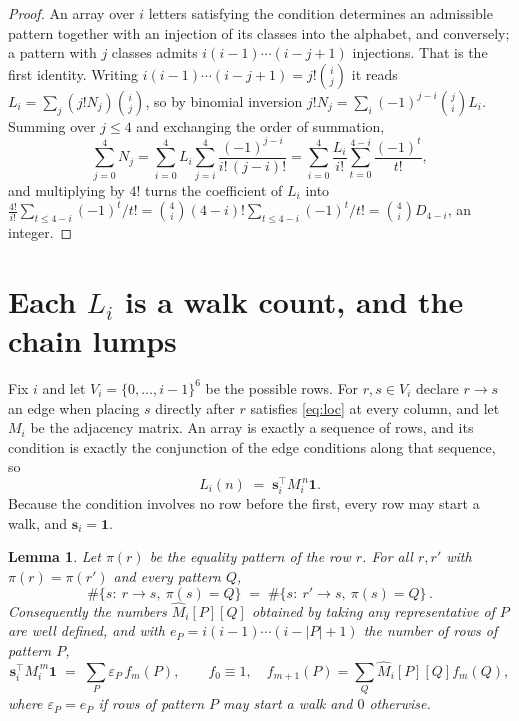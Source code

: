 \documentclass[11pt,a4paper]{article}
\theoremstyle{plain}
\newtheorem{lemma}[theorem]{Lemma}
\theoremstyle{definition}
\begin{document}
\begin{proof}
An array over $i$ letters satisfying the condition determines an admissible pattern together
with an injection of its classes into the alphabet, and conversely; a pattern with $j$
classes admits $i(i-1)\cdots(i-j+1)$ injections. That is the first identity. Writing
$i(i-1)\cdots(i-j+1)=j!\binom{i}{j}$ it reads $L_i=\sum_j (j!N_j)\binom{i}{j}$, so by
binomial inversion $j!N_j=\sum_{i}(-1)^{j-i}\binom{j}{i}L_i$. Summing over
$j\le 4$ and exchanging the order of summation,
\[
\sum_{j=0}^{4}N_j=\sum_{i=0}^{4}L_i\sum_{j=i}^{4}\frac{(-1)^{j-i}}{i!\,(j-i)!}
=\sum_{i=0}^{4}\frac{L_i}{i!}\sum_{t=0}^{4-i}\frac{(-1)^t}{t!} ,
\]
and multiplying by $4!$ turns the coefficient of $L_i$ into
$\frac{4!}{i!}\sum_{t\le 4-i}(-1)^t/t!=\binom{4}{i}(4-i)!\sum_{t\le 4-i}(-1)^t/t!
=\binom{4}{i}D_{4-i}$, an integer.
\end{proof}

\section{Each $L_i$ is a walk count, and the chain lumps}

Fix $i$ and let $V_i=\{0,\dots,i-1\}^{6}$ be the possible rows. For $r,s\in V_i$
declare $r\to s$ an edge when placing $s$ directly after $r$ satisfies \eqref{eq:loc} at
every column, and let $M_i$ be the adjacency matrix. An array is exactly a sequence of
rows, and its condition is exactly the conjunction of the edge conditions along that
sequence, so
\[
L_i(n)\;=\;\mathbf{s}_i^{\!\top}M_i^{\,n}\mathbf{1} .
\]
Because the condition involves no row before the first, every
row may start a walk, and $\mathbf{s}_i=\mathbf{1}$.

\begin{lemma}\label{lem:lump}
Let $\pi(r)$ be the equality pattern of the row $r$. For all $r,r'$ with
$\pi(r)=\pi(r')$ and every pattern $Q$,
\[
\#\{s:\ r\to s,\ \pi(s)=Q\}\;=\;\#\{s:\ r'\to s,\ \pi(s)=Q\}\, .
\]
Consequently the numbers $\widehat M_i[P][Q]$ obtained by taking any representative of $P$
are well defined, and with $e_P=i(i-1)\cdots(i-|P|+1)$ the number of rows of pattern $P$,
\[
\mathbf{s}_i^{\!\top}M_i^{\,m}\mathbf{1}\;=\;\sum_P \varepsilon_P\,f_m(P),
\qquad f_0\equiv1,\quad f_{m+1}(P)=\sum_Q\widehat M_i[P][Q]f_m(Q),
\]
where $\varepsilon_P=e_P$ if rows of pattern $P$ may start a walk and $0$ otherwise.
\end{lemma}
\end{document}
